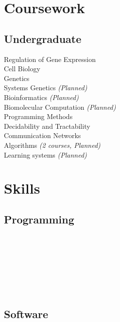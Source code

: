 \documentclass[]{resume}
\begin{document}
\begin{minipage}[t]{0.33\textwidth}
\section{Coursework}
\subsection{Undergraduate}
Regulation of Gene Expression \\
Cell Biology \\
Genetics \\
Systems Genetics {\footnotesize \textit{(Planned)}}\\
Bioinformatics {\footnotesize \textit{(Planned)}}\\
Biomolecular Computation {\footnotesize \textit{(Planned)}}\\
\sectionsep
{}
Programming Methods \\
Decidability and Tractability \\
Communication Networks \\
Algorithms {\footnotesize \textit{(2 courses, Planned)}} \\
Learning systems {\footnotesize \textit{(Planned)}}
\sectionsep

\section{Skills}
\subsection{Programming}
\\
\\
\\
\\
\\
\\
\sectionsep

\subsection{Software}
\\
\\
\\
\\
\sectionsep


\end{minipage}
\end{document}
